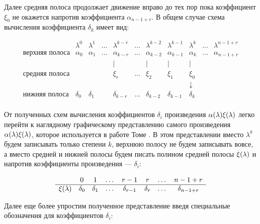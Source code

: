 Далее средняя полоса продолжает движение вправо до тех пор пока коэффициент $\xi_0$ не окажется напротив коэффициента $\alpha_{n-1+r}$.
В общем случае схема вычисления коэффициента $\delta_k$ имеет вид:

	$$
		\begin{array}{ccccccccccc}
			                      & \lambda^0 & \lambda^1 & \dots & \lambda^{k-r} & \dots & \lambda^{k-2} & \lambda^{k-1} & \lambda^k  & \dots & \lambda^{n-1+r} \\
			\hline
			\text{верхняя полоса} & \alpha_0  & \alpha_1  & \dots & \alpha_{k-r}  & \dots & \alpha_{k-2}  & \alpha_{k-1}  & \alpha_k   & \dots & \alpha_{n-1+r} \\
			                      &           &           &       & |             &       & |             & |             & |          &       & \\
			\text{средняя полоса} &           &           &       & \xi_r         & \dots & \xi_2         & \xi_1         & \xi_0      &       & \\
			                      &           &           &       &               &       &               &               & \downarrow &       & \\
			\text{нижняя полоса}  & \delta_0  & \delta_1  &       & \delta_{k-r}  & \dots & \delta_{k-2}  & \delta_{k-1}  & \delta_k   &       & \\
		\end{array}
	$$

От полученных схем вычисления коэффициентов $\delta_i$ произведения $\alpha (\lambda) \xi (\lambda)$ легко перейти к наглядному графическому
представлению самого произведения $\alpha (\lambda) \xi (\lambda)$, которое используется в работе Томе \cite{Thome}. В этом представлении
вместо $\lambda^k$ будем записывать только степени $k$, верхнюю полосу не будем записывать вовсе, а вместо средней и нижней полосы будем писать
полином средней полосы $\xi (\lambda)$ и напротив коэффициенты произведения --- $\delta_i$:

	$$
		\begin{array}{cccccccc}
			                 & 0        & 1        & \dots & r-1          & r        & \dots & n-1+r \\
			\hline
			\xi (\lambda) & \delta_0 & \delta_1 & \dots & \delta_{r-1} & \delta_r & \dots & \delta_{n-1+r} \\
		\end{array}
	$$

Далее еще более упростим полученное представление введя специальные обозначения для коэффициентов $\delta_i$:

